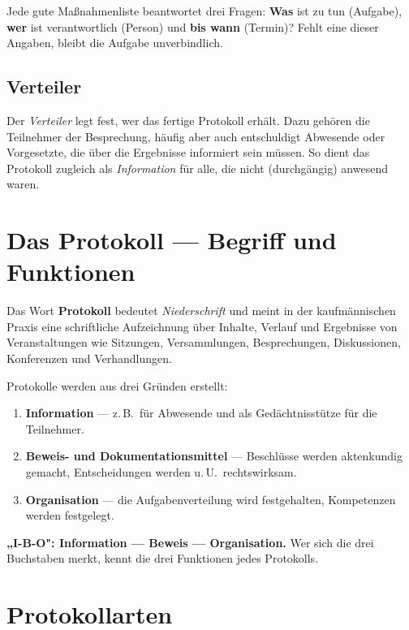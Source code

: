 \documentclass[11pt, a4paper]{article}
\begin{document}
\begin{merksatz}
Jede gute Maßnahmenliste beantwortet drei Fragen: \textbf{Was} ist zu tun (Aufgabe),
\textbf{wer} ist verantwortlich (Person) und \textbf{bis wann} (Termin)? Fehlt eine
dieser Angaben, bleibt die Aufgabe unverbindlich.
\end{merksatz}

\subsection{Verteiler}

Der \emph{Verteiler} legt fest, wer das fertige Protokoll erhält. Dazu gehören die
Teilnehmer der Besprechung, häufig aber auch entschuldigt Abwesende oder Vorgesetzte, die
über die Ergebnisse informiert sein müssen. So dient das Protokoll zugleich als
\emph{Information} für alle, die nicht (durchgängig) anwesend waren.

\section{Das Protokoll --- Begriff und Funktionen}

Das Wort \textbf{Protokoll} bedeutet \emph{Niederschrift} und meint in der kaufmännischen
Praxis eine schriftliche Aufzeichnung über Inhalte, Verlauf und Ergebnisse von
Veranstaltungen wie Sitzungen, Versammlungen, Besprechungen, Diskussionen, Konferenzen
und Verhandlungen.

Protokolle werden aus drei Gründen erstellt:

\begin{enumerate}
  \item \textbf{Information} --- z.\,B.\ für Abwesende und als Gedächtnisstütze für die Teilnehmer.
  \item \textbf{Beweis- und Dokumentationsmittel} --- Beschlüsse werden aktenkundig gemacht, Entscheidungen werden u.\,U.\ rechtswirksam.
  \item \textbf{Organisation} --- die Aufgabenverteilung wird festgehalten, Kompetenzen werden festgelegt.
\end{enumerate}

\begin{eselsbruecke}
\textbf{„I-B-O": Information --- Beweis --- Organisation.} Wer sich die drei Buchstaben
merkt, kennt die drei Funktionen jedes Protokolls.
\end{eselsbruecke}

\section{Protokollarten}
\end{document}
